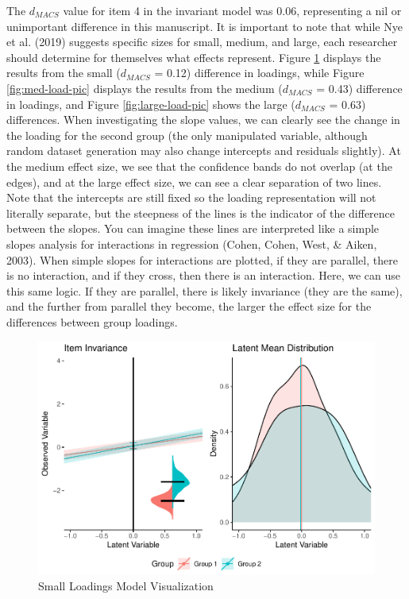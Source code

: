 \documentclass[
  man]{apa6}
\begin{document}
The \(d_{MACS}\) value for item 4 in the invariant model was 0.06, representing a nil or unimportant difference in this manuscript. It is important to note that while Nye et al. (2019) suggests specific sizes for small, medium, and large, each researcher should determine for themselves what effects represent. Figure \ref{fig:small-load-pic} displays the results from the small (\(d_{MACS}\) = 0.12) difference in loadings, while Figure \ref{fig:med-load-pic} displays the results from the medium (\(d_{MACS}\) = 0.43) difference in loadings, and Figure \ref{fig:large-load-pic} shows the large (\(d_{MACS}\) = 0.63) differences. When investigating the slope values, we can clearly see the change in the loading for the second group (the only manipulated variable, although random dataset generation may also change intercepts and residuals slightly). At the medium effect size, we see that the confidence bands do not overlap (at the edges), and at the large effect size, we can see a clear separation of two lines. Note that the intercepts are still fixed so the loading representation will not literally separate, but the steepness of the lines is the indicator of the difference between the slopes. You can imagine these lines are interpreted like a simple slopes analysis for interactions in regression (Cohen, Cohen, West, \& Aiken, 2003). When simple slopes for interactions are plotted, if they are parallel, there is no interaction, and if they cross, then there is an interaction. Here, we can use this same logic. If they are parallel, there is likely invariance (they are the same), and the further from parallel they become, the larger the effect size for the differences between group loadings.

\begin{figure}
\centering
\includegraphics{manuscript_files/figure-latex/small-load-pic-1.pdf}
\caption{\label{fig:small-load-pic}Small Loadings Model Visualization}
\end{figure}
\end{document}
